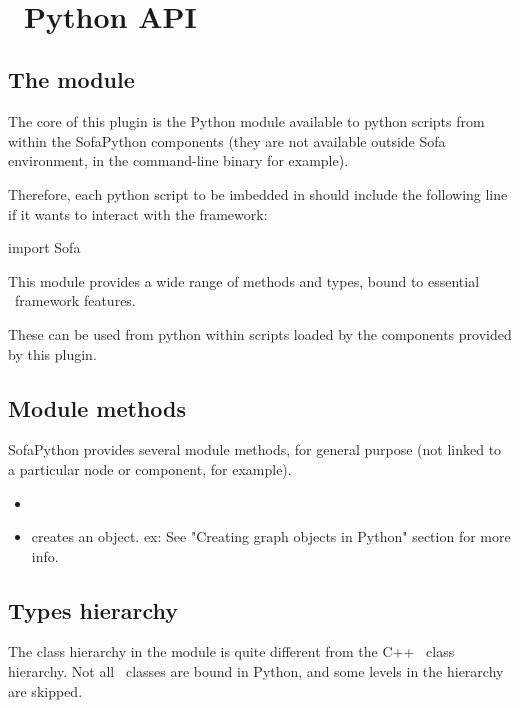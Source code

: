 \

\section{\sofa \ Python API}

\subsection{The  module}

The core of this plugin is the  Python module available to python scripts from within the SofaPython components (they are not available outside Sofa environment, in the command-line  binary for example).

Therefore, each python script to be imbedded in \sofa should include the following line if it wants to interact with the \sofa framework:

\begin{code_python}
import Sofa
\end{code_python}

This module provides a wide range of methods and types, bound to essential \sofa \ framework features.

These can be used from python within scripts loaded by the components provided by this plugin.

\subsection{Module methods}

SofaPython provides several module methods, for general purpose (not linked to a particular node or component, for example).

\begin{itemize}
\item {} 
\item {} creates an object. ex:  See "Creating graph objects in Python" section for more info.
\end{itemize}

\subsection{Types hierarchy}

The class hierarchy in the  module is quite different from the C++ \sofa \ class hierarchy. Not all \sofa \ classes are bound in Python, and some levels in the hierarchy are skipped.

